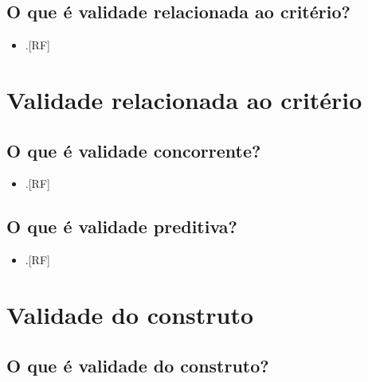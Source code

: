 \documentclass[
  a4paper,
]{book}
\providecommand{\tightlist}{%
  \setlength{\itemsep}{0pt}\setlength{\parskip}{0pt}}
\begin{document}
\hypertarget{o-que-uxe9-validade-relacionada-ao-crituxe9rio}{%
\subsection{O que é validade relacionada ao critério?}\label{o-que-uxe9-validade-relacionada-ao-crituxe9rio}}

\begin{itemize}
\tightlist
\item
  .{[}RF{]}
\end{itemize}

\hypertarget{validade-criterio}{%
\section{Validade relacionada ao critério}\label{validade-criterio}}

\hypertarget{o-que-uxe9-validade-concorrente}{%
\subsection{O que é validade concorrente?}\label{o-que-uxe9-validade-concorrente}}

\begin{itemize}
\tightlist
\item
  .{[}RF{]}
\end{itemize}

\hypertarget{o-que-uxe9-validade-preditiva}{%
\subsection{O que é validade preditiva?}\label{o-que-uxe9-validade-preditiva}}

\begin{itemize}
\tightlist
\item
  .{[}RF{]}
\end{itemize}

\hypertarget{validade-constructo}{%
\section{Validade do construto}\label{validade-constructo}}

\hypertarget{o-que-uxe9-validade-do-construto}{%
\subsection{O que é validade do construto?}\label{o-que-uxe9-validade-do-construto}}
\end{document}
